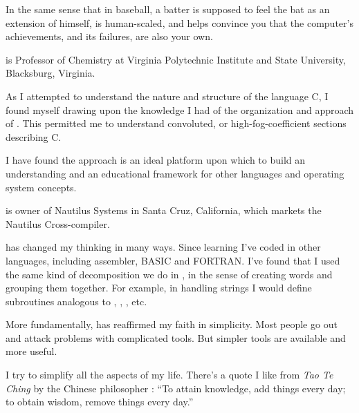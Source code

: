 \begin{interview}
\begin{tfquot}
In the same sense that in baseball, a batter is supposed to feel the bat
as an extension of himself, \Forth{} is human-scaled, and helps convince
you that the computer's achievements, and its failures, are also your own.
\end{tfquot}
 is Professor of Chemistry at Virginia
Polytechnic Institute and State University, Blacksburg, Virginia.
\begin{tfquot}
As I attempted to understand the nature and structure of the language C, I
found myself drawing upon the knowledge I had of the organization and
approach of \Forth{}.  This permitted me to understand convoluted, or
high-fog-coefficient sections describing C.

I have found the \Forth{} approach is an ideal platform upon which to build
an understanding and an educational framework for other languages and
operating system concepts.
\end{tfquot}
 is owner of Nautilus Systems in Santa Cruz,
California, which markets the Nautilus Cross-compiler.
\begin{tfquot}
\Forth{} has changed my thinking in many ways.  Since learning \Forth{} 
I've coded in other languages, including assembler, BASIC and FORTRAN.
I've found that I used the same kind of decomposition we do in
\Forth{}, in the sense of creating words and grouping them together.  For
example, in handling strings I would define subroutines analogous to
, , , etc.

More fundamentally, \Forth{} has reaffirmed my faith in simplicity.  Most 
people go out and attack problems with complicated tools.  But simpler
tools are available and more useful.

I try to simplify all the aspects of my life.  There's a quote I like
from \emph{Tao Te Ching}
by the Chinese philosopher : ``To attain knowledge, add 
things every day; to obtain wisdom, remove things every day.''
\end{tfquot}
\end{interview}
